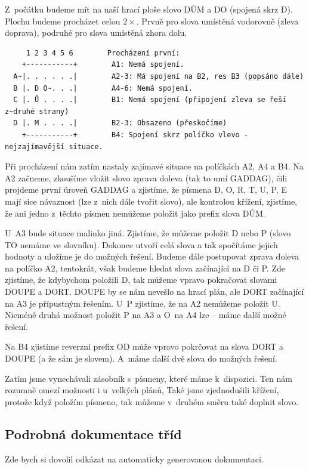 \documentclass[a4paper]{article}
\begin{document}
Z~počátku budeme mít na naší hrací ploše slovo DŮM a DO (spojená skrz D). Plochu budeme procházet celou $2\times$. Prvně pro slova umístěná vodorovně (zleva doprava), podruhé pro slova umístěná zhora dolu.
\clearpage
\begin{verbatim}
     1 2 3 4 5 6        Procházení první:
    +-----------+        A1: Nemá spojení.
  A~|. . . . . .|        A2-3: Má spojení na B2, res B3 (popsáno dále)
  B |. D O~. . .|        A4-6: Nemá spojení.
  C |. Ů . . . .|        B1: Nemá spojení (připojení zleva se řeší z~druhé strany)
  D |. M . . . .|        B2-3: Obsazeno (přeskočíme)
    +-----------+        B4: Spojení skrz políčko vlevo - nejzajímavější situace.
\end{verbatim}
Při procházení nám zatím nastaly zajímavé situace na políčkách A2, A4 a B4. Na A2 začneme, zkoušíme vložit slovo zprava doleva (tak to umí GADDAG), čili projdeme první úroveň GADDAG a zjistíme, že písmena D, O, R, T, U, P, E mají sice návaznost (lze z~nich dále tvořit slovo), ale kontrolou křížení, zjistíme,  že ani jedno z~těchto písmen nemůžeme položit jako prefix slova DŮM.

U~A3 bude situace malinko jiná. Zjistíme, že můžeme položit D nebo P (slovo TO nemáme ve slovníku). Dokonce utvoří celá slova a tak spočítáme jejich hodnoty a uložíme je do možných řešení. Budeme dále postupovat zprava doleva na políčko A2, tentokrát, však budeme hledat slova začínající na D či P. Zde zjistíme, že kdybychom položili D, tak můžeme vpravo pokračovat slovami DOUPE a DORT. DOUPE by se nám nevešlo na hrací plán, ale DORT začínající na A3 je přípustným řešením. U~P zjistíme, že na A2 nemůžeme položit U. Nicméně druhá možnost položit P na A3 a O~na A4 lze -- máme další možné řešení.

Na B4 zjistíme reverzní prefix OD může vpravo pokrčovat na slova DORT a DOUPE (a že sám je slovem). A~máme další dvě slova do možných řešení. 

Zatím jsme vynechávali zásobník s~písmeny, které máme k~dispozici. Ten nám rozumně omezí možnosti i u~velkých plánů, Také jsme zjednodušili křížení, protože když položím písmeno, tak můžeme v~druhém směru také doplnit slovo.



\subsection{Podrobná dokumentace tříd}
Zde bych si dovolil odkázat na automaticky generovanou dokumentaci. 
\end{document}
